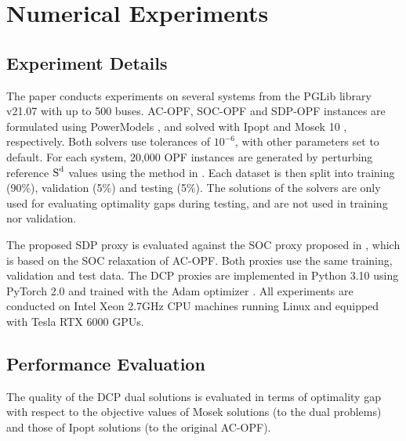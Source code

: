 \section{Numerical Experiments}
\label{sec:results}

\newcommand{\ieeeXXXS}{\texttt{ieee14}}
\newcommand{\ieeeXXS}{\texttt{ieee30}}
\newcommand{\pegaseXS}{\texttt{pegase89}}
\newcommand{\ieeeXS}{\texttt{ieee118}}
\newcommand{\ieeeS}{\texttt{ieee300}}



\subsection{Experiment Details}
\label{sec:results:data_generation}

The paper conducts experiments on several systems from the PGLib library v21.07 \cite{babaeinejadsarookolaee2019power} with up to 500 buses.
AC-OPF, SOC-OPF and SDP-OPF instances are formulated using PowerModels \cite{power_models}, and solved with Ipopt \cite{wachter2006implementation} and Mosek 10 \cite{mosek}, respectively.
Both solvers use tolerances of $10^{-6}$, with other parameters set to default.
For each system, 20,000 OPF instances are generated by perturbing reference $\text{S}^{\text{d}}$ values using the method in \cite{anonymous2024pglearn}.
Each dataset is then split into training (90\%), validation (5\%) and testing (5\%).
The solutions of the solvers are only used for evaluating optimality gaps during testing, and are not used in training nor validation.

The proposed SDP proxy is evaluated against the SOC proxy proposed in \cite{qiu2024dual}, which is based on the SOC relaxation of AC-OPF.
Both proxies use the same training, validation and test data.
The DCP proxies are implemented in Python 3.10 using PyTorch 2.0 \cite{paszke2019pytorch} and trained with the Adam optimizer \cite{kingma2014adam}.
All experiments are conducted on Intel Xeon 2.7GHz CPU machines running Linux and equipped with Tesla RTX 6000 GPUs.



\subsection{Performance Evaluation}
The quality of the DCP dual solutions is evaluated in terms of optimality gap with respect to the objective values of Mosek solutions (to the dual problems) and those of Ipopt solutions (to the original AC-OPF).

